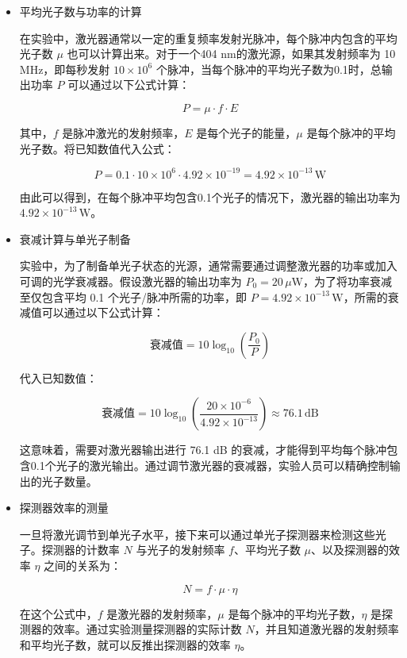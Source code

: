 \begin{enumerate}
\begin{itemize}
		这里，\(h = 6.626 \times 10^{-34} \, \text{J·s}\) 是普朗克常量，\(c = 3 \times 10^8 \, \text{m/s}\) 是光速，\(λ = 404 \, \text{nm}\) 是激光的波长。
		
		\item 平均光子数与功率的计算
		
		在实验中，激光器通常以一定的重复频率发射光脉冲，每个脉冲内包含的平均光子数 \( \mu \) 也可以计算出来。对于一个404 nm的激光源，如果其发射频率为 10 MHz，即每秒发射 \( 10 \times 10^6 \) 个脉冲，当每个脉冲的平均光子数为0.1时，总输出功率 \(P\) 可以通过以下公式计算：
		
		\[
		P = \mu \cdot f \cdot E
		\]
		
		其中，\(f\) 是脉冲激光的发射频率，\(E\) 是每个光子的能量，\(\mu\) 是每个脉冲的平均光子数。将已知数值代入公式：
		
		\[
		P = 0.1 \cdot 10 \times 10^6 \cdot 4.92 \times 10^{-19} = 4.92 \times 10^{-13} \, \text{W}
		\]
		
		由此可以得到，在每个脉冲平均包含0.1个光子的情况下，激光器的输出功率为 \( 4.92 \times 10^{-13} \, \text{W} \)。
		
		\item 衰减计算与单光子制备
		
		实验中，为了制备单光子状态的光源，通常需要通过调整激光器的功率或加入可调的光学衰减器。假设激光器的输出功率为 \( P_0 = 20 \, \mu \text{W} \)，为了将功率衰减至仅包含平均 0.1 个光子/脉冲所需的功率，即 \( P = 4.92 \times 10^{-13} \, \text{W} \)，所需的衰减值可以通过以下公式计算：
		
		\[
		\text{衰减值} = 10 \log_{10} \left( \frac{P_0}{P} \right)
		\]
		
		代入已知数值：
		
		\[
		\text{衰减值} = 10 \log_{10} \left( \frac{20 \times 10^{-6}}{4.92 \times 10^{-13}} \right) \approx 76.1 \, \text{dB}
		\]
		
		这意味着，需要对激光器输出进行 76.1 dB 的衰减，才能得到平均每个脉冲包含0.1个光子的激光输出。通过调节激光器的衰减器，实验人员可以精确控制输出的光子数量。
		
		\item 探测器效率的测量
		
		一旦将激光调节到单光子水平，接下来可以通过单光子探测器来检测这些光子。探测器的计数率 \( N \) 与光子的发射频率 \( f \)、平均光子数 \( \mu \)、以及探测器的效率 \( \eta \) 之间的关系为：
		
		\[
		N = f \cdot \mu \cdot \eta
		\]
		
		在这个公式中，\(f\) 是激光器的发射频率，\( \mu \) 是每个脉冲的平均光子数，\( \eta \) 是探测器的效率。通过实验测量探测器的实际计数 \(N\)，并且知道激光器的发射频率和平均光子数，就可以反推出探测器的效率 \( \eta \)。
		

\end{itemize}
\end{enumerate}
